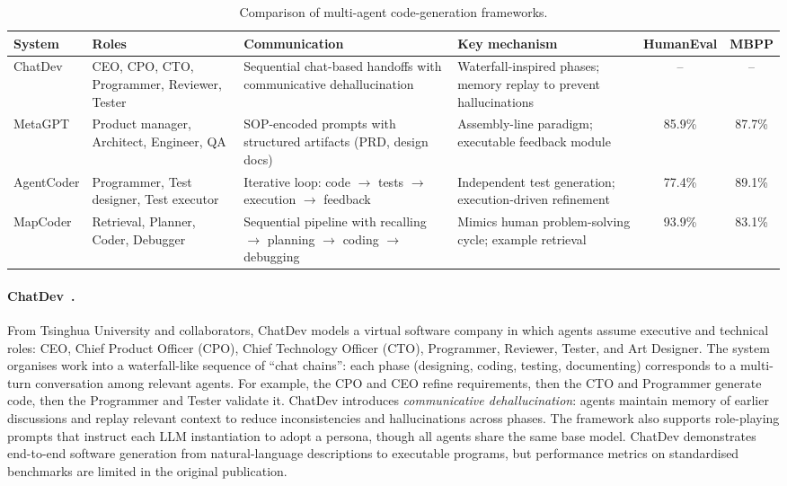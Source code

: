 \begin{table}[t]
  \centering
  \caption{Comparison of multi-agent code-generation frameworks.}
  \label{tab:multiagent}
  \small
  \begin{tabular}{@{}llp{}p{}cc@{}}
    \toprule
    \textbf{System} & \textbf{Roles} & \textbf{Communication} & \textbf{Key mechanism} & \textbf{HumanEval} & \textbf{MBPP} \\
    \midrule
    ChatDev & CEO, CPO, CTO, Programmer, Reviewer, Tester
      & Sequential chat-based handoffs with communicative dehallucination
      & Waterfall-inspired phases; memory replay to prevent hallucinations
      & -- & -- \\
    MetaGPT & Product manager, Architect, Engineer, QA
      & SOP-encoded prompts with structured artifacts (PRD, design docs)
      & Assembly-line paradigm; executable feedback module
      & 85.9\% & 87.7\% \\
    AgentCoder & Programmer, Test designer, Test executor
      & Iterative loop: code $\to$ tests $\to$ execution $\to$ feedback
      & Independent test generation; execution-driven refinement
      & 77.4\% & 89.1\% \\
    MapCoder & Retrieval, Planner, Coder, Debugger
      & Sequential pipeline with recalling $\to$ planning $\to$ coding $\to$ debugging
      & Mimics human problem-solving cycle; example retrieval
      & 93.9\% & 83.1\% \\
    \bottomrule
  \end{tabular}
\end{table}

\paragraph{ChatDev~\cite{qian2024chatdev}.}
From Tsinghua University and collaborators, ChatDev models a virtual software
company in which agents assume executive and technical roles: CEO, Chief
Product Officer (CPO), Chief Technology Officer (CTO), Programmer, Reviewer,
Tester, and Art Designer. The system organises work into a waterfall-like
sequence of ``chat chains'': each phase (designing, coding, testing,
documenting) corresponds to a multi-turn conversation among relevant agents.
For example, the CPO and CEO refine requirements, then the CTO and Programmer
generate code, then the Programmer and Tester validate it. ChatDev introduces
\emph{communicative dehallucination}: agents maintain memory of earlier
discussions and replay relevant context to reduce inconsistencies and
hallucinations across phases. The framework also supports role-playing prompts
that instruct each LLM instantiation to adopt a persona, though all agents
share the same base model. ChatDev demonstrates end-to-end software generation
from natural-language descriptions to executable programs, but performance
metrics on standardised benchmarks are limited in the original publication.

